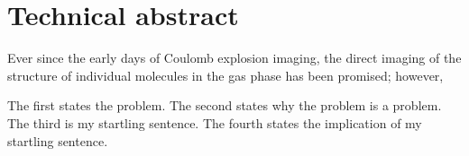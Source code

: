 \begingroup
\let\clearpage\relax
\let\cleardoublepage\relax
\let\cleardoublepage\relax

\chapter*{Technical abstract}
Ever since the early days of Coulomb explosion imaging, the direct imaging of the structure of individual molecules in the gas phase has been promised; however, 

The first states the problem. The second states why the problem is a problem. The third is my startling sentence. The fourth states the implication of my startling sentence.

\vfill

\endgroup			

\vfill